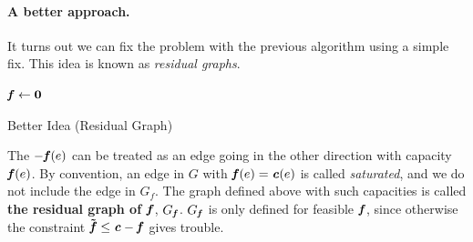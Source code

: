 \paragraph{A better approach.} It turns out we can fix the problem
with the previous algorithm using a simple fix. This idea is known as
\emph{residual graphs}.

\begin{algorithm}[H]
\SetAlgoLined
 \(\boldsymbol{\mathit{f}} \leftarrow \boldsymbol{0}\)\;
 \caption{Better Idea (Residual Graph)}
\end{algorithm}

The \(-\boldsymbol{\mathit{f}}(e)\) can be treated as an edge going in the other direction with
capacity \(\boldsymbol{\mathit{f}}(e)\).
By convention, an edge in $G$ with $\boldsymbol{\mathit{f}}(e) = \boldsymbol{\mathit{c}}(e)$ is called
\emph{saturated}, and we do not include the edge in $G_f$.
The graph defined above with such
capacities is called \textbf{the residual graph of \(\boldsymbol{\mathit{f}}\)},
\(G_{\boldsymbol{\mathit{f}}}\).  \(G_{\boldsymbol{\mathit{f}}}\) is only defined for feasible \(\boldsymbol{\mathit{f}}\), since
otherwise the constraint $\boldsymbol{\tilde{\mathit{f}}} \leq \boldsymbol{\mathit{c}} - \boldsymbol{\mathit{f}}$ gives trouble.


